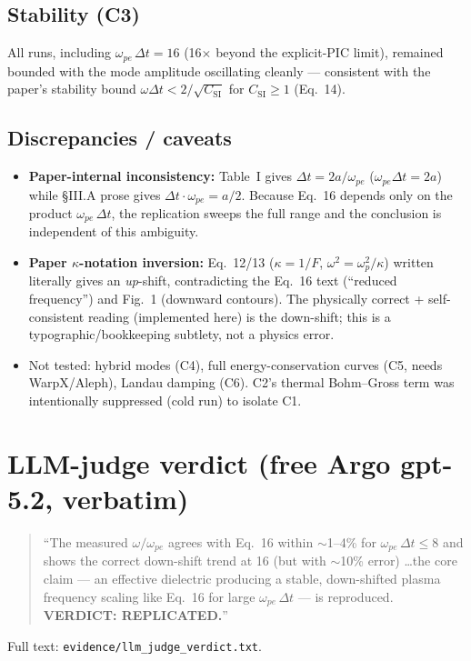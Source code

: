 \documentclass[11pt]{article}
\begin{document}
\subsection*{Stability (C3)}
All runs, including $\omega_{pe}\,\Delta t=16$ (16$\times$ beyond the
explicit-PIC limit), remained bounded with the mode amplitude
oscillating cleanly --- consistent with the paper's stability bound
$\omega\Delta t < 2/\sqrt{C_{\text{SI}}}$ for $C_{\text{SI}}\ge 1$
(Eq.~14).

\subsection*{Discrepancies / caveats}
\begin{itemize}
  \item \textbf{Paper-internal inconsistency:} Table~I gives $\Delta t =
        2a/\omega_{pe}$ ($\omega_{pe}\Delta t = 2a$) while \S III.A
        prose gives $\Delta t\cdot\omega_{pe} = a/2$. Because Eq.~16
        depends only on the product $\omega_{pe}\,\Delta t$, the
        replication sweeps the full range and the conclusion is
        independent of this ambiguity.
  \item \textbf{Paper $\kappa$-notation inversion:} Eq.~12/13
        ($\kappa=1/F$, $\omega^{2}=\omega_{p}^{2}/\kappa$) written
        literally gives an \emph{up}-shift, contradicting the Eq.~16
        text (``reduced frequency'') and Fig.~1 (downward contours).
        The physically correct + self-consistent reading (implemented
        here) is the down-shift; this is a typographic/bookkeeping
        subtlety, not a physics error.
  \item Not tested: hybrid modes (C4), full energy-conservation curves
        (C5, needs WarpX/Aleph), Landau damping (C6). C2's thermal
        Bohm--Gross term was intentionally suppressed (cold run) to
        isolate C1.
\end{itemize}

\section{LLM-judge verdict (free Argo gpt-5.2, verbatim)}
\begin{quote}
``The measured $\omega/\omega_{pe}$ agrees with Eq.~16 within
$\sim$1--4\% for $\omega_{pe}\,\Delta t\le 8$ and shows the correct
down-shift trend at 16 (but with $\sim$10\% error) \ldots the core
claim --- an effective dielectric producing a stable, down-shifted
plasma frequency scaling like Eq.~16 for large $\omega_{pe}\,\Delta t$
--- is reproduced. \textbf{VERDICT: REPLICATED.}''
\end{quote}
Full text: \texttt{evidence/llm\_judge\_verdict.txt}.
\end{document}
